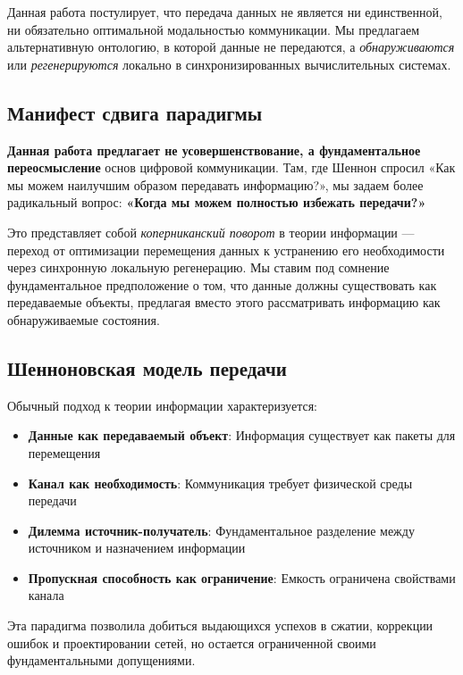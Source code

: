 \documentclass[11pt,a4paper]{article}
\begin{document}
Данная работа постулирует, что передача данных не является ни единственной, ни обязательно оптимальной модальностью коммуникации. Мы предлагаем альтернативную онтологию, в которой данные не передаются, а \emph{обнаруживаются} или \emph{регенерируются} локально в синхронизированных вычислительных системах.

\subsection{Манифест сдвига парадигмы}

\textbf{Данная работа предлагает не усовершенствование, а фундаментальное переосмысление} основ цифровой коммуникации. Там, где Шеннон спросил «Как мы можем наилучшим образом передавать информацию?», мы задаем более радикальный вопрос: \textbf{«Когда мы можем полностью избежать передачи?»}

Это представляет собой \emph{коперниканский поворот} в теории информации — переход от оптимизации перемещения данных к устранению его необходимости через синхронную локальную регенерацию. Мы ставим под сомнение фундаментальное предположение о том, что данные должны существовать как передаваемые объекты, предлагая вместо этого рассматривать информацию как обнаруживаемые состояния.

\subsection{Шенноновская модель передачи}

Обычный подход к теории информации характеризуется:

\begin{itemize}
    \item \textbf{Данные как передаваемый объект}: Информация существует как пакеты для перемещения
    \item \textbf{Канал как необходимость}: Коммуникация требует физической среды передачи
    \item \textbf{Дилемма источник-получатель}: Фундаментальное разделение между источником и назначением информации
    \item \textbf{Пропускная способность как ограничение}: Емкость ограничена свойствами канала
\end{itemize}

Эта парадигма позволила добиться выдающихся успехов в сжатии, коррекции ошибок и проектировании сетей, но остается ограниченной своими фундаментальными допущениями.
\end{document}
